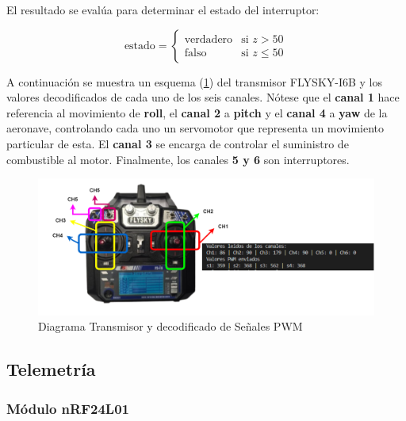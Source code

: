 El resultado se evalúa para determinar el estado del interruptor:

\begin{equation}
\text{estado} = 
\begin{cases} 
\text{verdadero} & \text{si } z > 50 \\
\text{falso} & \text{si } z \leq 50 
\end{cases}
\end{equation}

A continuación se muestra un esquema (\ref{fig:decodificador_transmisor}) del transmisor FLYSKY-I6B y los valores decodificados de cada uno de los seis canales. Nótese que el \textbf{canal 1} hace referencia al movimiento de \textbf{roll}, el \textbf{canal 2} a \textbf{pitch} y el \textbf{canal 4} a \textbf{yaw} de la aeronave, controlando cada uno un servomotor que representa un movimiento particular de esta. El \textbf{canal 3} se encarga de controlar el suministro de combustible al motor. Finalmente, los canales \textbf{5 y 6} son interruptores.


\begin{figure}[H]
    \centering
    \includegraphics[width=6 in]{Imagenes/Metodologia/Diagrama Receptor.png}
    \caption{Diagrama Transmisor y decodificado de Señales PWM}
    \label{fig:decodificador_transmisor}
\end{figure}



\subsection{Telemetría}





\subsubsection{Módulo nRF24L01}\\ \\

